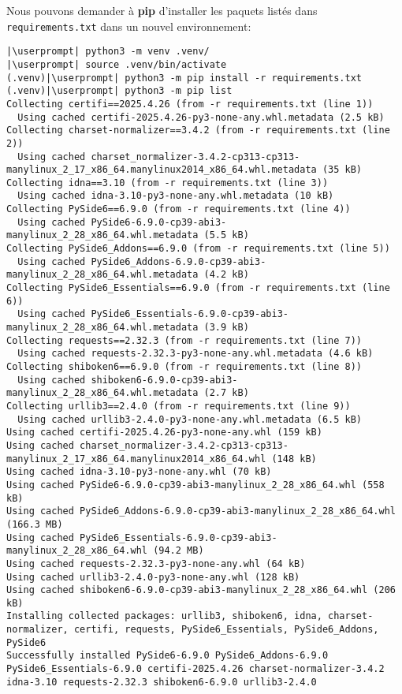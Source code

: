 Nous pouvons demander à \textbf{pip} d’installer les paquets listés dans \texttt{requirements.txt} dans un nouvel environnement:
\begin{lstlisting}[style=bash]
|\userprompt| python3 -m venv .venv/
|\userprompt| source .venv/bin/activate
(.venv)|\userprompt| python3 -m pip install -r requirements.txt
(.venv)|\userprompt| python3 -m pip list
Collecting certifi==2025.4.26 (from -r requirements.txt (line 1))
  Using cached certifi-2025.4.26-py3-none-any.whl.metadata (2.5 kB)
Collecting charset-normalizer==3.4.2 (from -r requirements.txt (line 2))
  Using cached charset_normalizer-3.4.2-cp313-cp313-manylinux_2_17_x86_64.manylinux2014_x86_64.whl.metadata (35 kB)
Collecting idna==3.10 (from -r requirements.txt (line 3))
  Using cached idna-3.10-py3-none-any.whl.metadata (10 kB)
Collecting PySide6==6.9.0 (from -r requirements.txt (line 4))
  Using cached PySide6-6.9.0-cp39-abi3-manylinux_2_28_x86_64.whl.metadata (5.5 kB)
Collecting PySide6_Addons==6.9.0 (from -r requirements.txt (line 5))
  Using cached PySide6_Addons-6.9.0-cp39-abi3-manylinux_2_28_x86_64.whl.metadata (4.2 kB)
Collecting PySide6_Essentials==6.9.0 (from -r requirements.txt (line 6))
  Using cached PySide6_Essentials-6.9.0-cp39-abi3-manylinux_2_28_x86_64.whl.metadata (3.9 kB)
Collecting requests==2.32.3 (from -r requirements.txt (line 7))
  Using cached requests-2.32.3-py3-none-any.whl.metadata (4.6 kB)
Collecting shiboken6==6.9.0 (from -r requirements.txt (line 8))
  Using cached shiboken6-6.9.0-cp39-abi3-manylinux_2_28_x86_64.whl.metadata (2.7 kB)
Collecting urllib3==2.4.0 (from -r requirements.txt (line 9))
  Using cached urllib3-2.4.0-py3-none-any.whl.metadata (6.5 kB)
Using cached certifi-2025.4.26-py3-none-any.whl (159 kB)
Using cached charset_normalizer-3.4.2-cp313-cp313-manylinux_2_17_x86_64.manylinux2014_x86_64.whl (148 kB)
Using cached idna-3.10-py3-none-any.whl (70 kB)
Using cached PySide6-6.9.0-cp39-abi3-manylinux_2_28_x86_64.whl (558 kB)
Using cached PySide6_Addons-6.9.0-cp39-abi3-manylinux_2_28_x86_64.whl (166.3 MB)
Using cached PySide6_Essentials-6.9.0-cp39-abi3-manylinux_2_28_x86_64.whl (94.2 MB)
Using cached requests-2.32.3-py3-none-any.whl (64 kB)
Using cached urllib3-2.4.0-py3-none-any.whl (128 kB)
Using cached shiboken6-6.9.0-cp39-abi3-manylinux_2_28_x86_64.whl (206 kB)
Installing collected packages: urllib3, shiboken6, idna, charset-normalizer, certifi, requests, PySide6_Essentials, PySide6_Addons, PySide6
Successfully installed PySide6-6.9.0 PySide6_Addons-6.9.0 PySide6_Essentials-6.9.0 certifi-2025.4.26 charset-normalizer-3.4.2 idna-3.10 requests-2.32.3 shiboken6-6.9.0 urllib3-2.4.0
\end{lstlisting}

